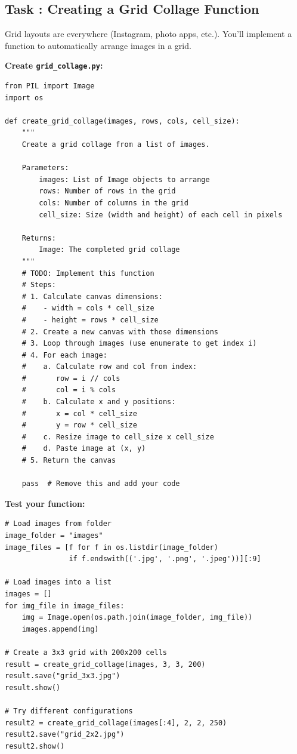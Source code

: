 \documentclass[11pt]{article}
\newcounter{taskcounter}
\newcommand{\task}[1]{%
    \stepcounter{taskcounter}%
    \subsection*{Task \thetaskcounter: #1}%
}
\begin{document}
\task{Creating a Grid Collage Function}

Grid layouts are everywhere (Instagram, photo apps, etc.). You'll implement a function to automatically arrange images in a grid.

\textbf{Create \texttt{grid\_collage.py}:}

\begin{lstlisting}
from PIL import Image
import os

def create_grid_collage(images, rows, cols, cell_size):
    """
    Create a grid collage from a list of images.

    Parameters:
        images: List of Image objects to arrange
        rows: Number of rows in the grid
        cols: Number of columns in the grid
        cell_size: Size (width and height) of each cell in pixels

    Returns:
        Image: The completed grid collage
    """
    # TODO: Implement this function
    # Steps:
    # 1. Calculate canvas dimensions:
    #    - width = cols * cell_size
    #    - height = rows * cell_size
    # 2. Create a new canvas with those dimensions
    # 3. Loop through images (use enumerate to get index i)
    # 4. For each image:
    #    a. Calculate row and col from index:
    #       row = i // cols
    #       col = i % cols
    #    b. Calculate x and y positions:
    #       x = col * cell_size
    #       y = row * cell_size
    #    c. Resize image to cell_size x cell_size
    #    d. Paste image at (x, y)
    # 5. Return the canvas

    pass  # Remove this and add your code
\end{lstlisting}

\textbf{Test your function:}

\begin{lstlisting}
# Load images from folder
image_folder = "images"
image_files = [f for f in os.listdir(image_folder)
               if f.endswith(('.jpg', '.png', '.jpeg'))][:9]

# Load images into a list
images = []
for img_file in image_files:
    img = Image.open(os.path.join(image_folder, img_file))
    images.append(img)

# Create a 3x3 grid with 200x200 cells
result = create_grid_collage(images, 3, 3, 200)
result.save("grid_3x3.jpg")
result.show()

# Try different configurations
result2 = create_grid_collage(images[:4], 2, 2, 250)
result2.save("grid_2x2.jpg")
result2.show()
\end{lstlisting}
\end{document}
